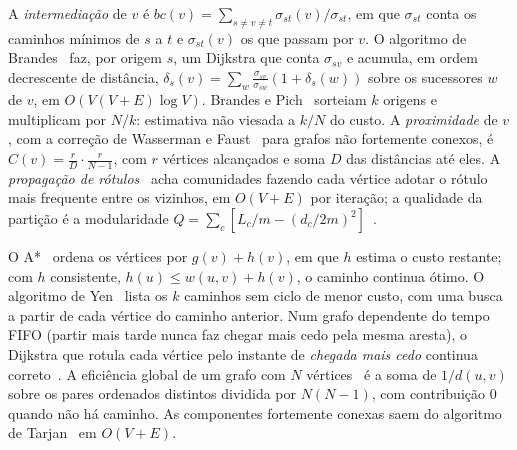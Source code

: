 A \emph{intermediação} de $v$ é $bc(v) = \sum_{s \ne v \ne t} \sigma_{st}(v)/\sigma_{st}$,
em que $\sigma_{st}$ conta os caminhos mínimos de $s$ a $t$ e $\sigma_{st}(v)$ os que passam
por $v$. O algoritmo de Brandes~\cite{brandes2001} faz, por origem $s$, um Dijkstra que conta
$\sigma_{sv}$ e acumula, em ordem decrescente de distância,
$\delta_s(v) = \sum_{w} \frac{\sigma_{sv}}{\sigma_{sw}}(1 + \delta_s(w))$ sobre os sucessores
$w$ de $v$, em $O(V(V + E)\log V)$. Brandes e Pich~\cite{brandes2007} sorteiam $k$ origens e
multiplicam por $N/k$: estimativa não viesada a $k/N$ do custo. A \emph{proximidade} de $v$,
com a correção de Wasserman e Faust~\cite{wasserman1994} para grafos não fortemente conexos, é
$C(v) = \frac{r}{D}\cdot\frac{r}{N - 1}$, com $r$ vértices alcançados e soma $D$ das distâncias
até eles. A \emph{propagação de rótulos}~\cite{raghavan2007} acha comunidades fazendo cada
vértice adotar o rótulo mais frequente entre os vizinhos, em $O(V + E)$ por iteração; a
qualidade da partição é a modularidade $Q = \sum_c [L_c/m - (d_c/2m)^2]$~\cite{newman2004}.

O A*~\cite{hart1968} ordena os vértices por $g(v) + h(v)$, em que $h$ estima o custo
restante; com $h$ consistente, $h(u) \le w(u, v) + h(v)$, o caminho continua ótimo. O
algoritmo de Yen~\cite{yen1971} lista os $k$ caminhos sem ciclo de menor custo, com uma busca
a partir de cada vértice do caminho anterior. Num grafo dependente do tempo FIFO (partir mais
tarde nunca faz chegar mais cedo pela mesma aresta), o Dijkstra que rotula cada vértice pelo
instante de \emph{chegada mais cedo} continua correto~\cite{pyrga2008}. A eficiência global de
um grafo com $N$ vértices~\cite[eq.~1]{latora2001} é a soma de $1/d(u, v)$ sobre os pares
ordenados distintos dividida por $N(N-1)$, com contribuição 0 quando não há caminho. As
componentes fortemente conexas saem do algoritmo de Tarjan~\cite{tarjan1972} em $O(V + E)$.
